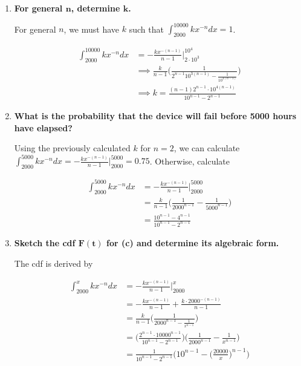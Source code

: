 \documentclass[10pt, oneside]{article}   	%
\theoremstyle{definition}
\begin{document}
\begin{enumerate}[label=4.\arabic*]
\begin{enumerate}
	\item  \begin{tcolorbox}[
	  colback=Cerulean!5!white,
	  colframe=Cerulean!75!black]
	\textbf{For general $\bm{n}$, determine $\bm{k}$.}
	\end{tcolorbox}
	
	For general $n$, we must have $k$ such that $\int^{10000}_{2000} kx^{-n}dx = 1$.
	
	\begin{align*}
	\int^{10000}_{2000} kx^{-n}dx &= -\frac{kx^{-(n-1)}}{n-1} \Big|^{10^4}_{2 \cdot 10^3} \\
	&\implies \frac{k}{n-1} \Bigg( \frac{1}{2^{n-1} 10^{3(n-1)} - \frac{1}{10^{4(n-1)}}} \Bigg) \\
	&\implies \boxed{ k = \frac{(n-1) 2^{n-1} \cdot 10^{4(n-1)}}{10^{n-1} - 2^{n-1}} }
	\end{align*}
	
	\item  \begin{tcolorbox}[
	  colback=Cerulean!5!white,
	  colframe=Cerulean!75!black]
	\textbf{What is the probability that the device will fail before 5000 hours have elapsed?}
	\end{tcolorbox}
	
	Using the previously calculated $k$ for $n=2$, we can calculate $\int^{5000}_{2000} kx^{-n} dx = -\frac{kx^{-(n-1)}}{n-1} \Big|^{5000}_{2000} = \boxed{0.75}$. Otherwise, calculate
	
	\begin{align*}
	\int^{5000}_{2000} kx^{-n} dx &= -\frac{kx^{-(n-1)}}{n-1} \Big|^{5000}_{2000} \\
	&= \frac{k}{n-1} \Bigg( \frac{1}{2000^{n-1}} - \frac{1}{5000^{n-1}} \Bigg) \\
	&= \boxed{ \frac{10^{n-1} - 4^{n-1} }{10^{n-1} - 2^{n-1}} }
	\end{align*}
	
	\item  \begin{tcolorbox}[
	  colback=Cerulean!5!white,
	  colframe=Cerulean!75!black]
	\textbf{Sketch the cdf $\bm{F(t)}$ for (c) and determine its algebraic form.}
	\end{tcolorbox}
	
	The cdf is derived by
	
	\begin{align*}
	\int^x_{2000} kx^{-n} dx &= -\frac{kx^{-(n-1)}}{n-1} \Big|^x_{2000} \\
	&= -\frac{kx^{-(n-1)}}{n-1} + \frac{k \cdot 2000^{-(n-1)}}{n-1} \\
	&= \frac{k}{n-1} \Bigg( \frac{1}{2000^{n-1} - \frac{1}{x^{n-1}}} \Bigg) \\
	&= \Bigg( \frac{2^{n-1} \cdot 10000^{n-1}}{10^{n-1} - 2^{n-1}} \Bigg) \Bigg( \frac{1}{2000^{n-1}} - \frac{1}{x^{n-1}} \Bigg) \\
	&= \frac{1}{10^{n-1} - 2^{n-1}} \Bigg( 10^{n-1} - \Bigg( \frac{20000}{x} \Bigg)^{n-1} \Bigg)
	\end{align*}
	

\end{enumerate}
\end{enumerate}
\end{document}
